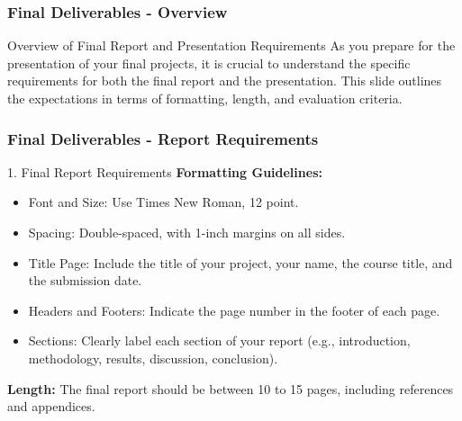 \documentclass{beamer}
\begin{document}
\begin{frame}[fragile]
    \frametitle{Final Deliverables - Overview}
    \begin{block}{Overview of Final Report and Presentation Requirements}
        As you prepare for the presentation of your final projects, it is crucial to understand the specific requirements for both the final report and the presentation. This slide outlines the expectations in terms of formatting, length, and evaluation criteria.
    \end{block}
\end{frame}

\begin{frame}[fragile]
    \frametitle{Final Deliverables - Report Requirements}
    \begin{block}{1. Final Report Requirements}
        \textbf{Formatting Guidelines:}
        \begin{itemize}
            \item Font and Size: Use Times New Roman, 12 point.
            \item Spacing: Double-spaced, with 1-inch margins on all sides.
            \item Title Page: Include the title of your project, your name, the course title, and the submission date.
            \item Headers and Footers: Indicate the page number in the footer of each page.
            \item Sections: Clearly label each section of your report (e.g., introduction, methodology, results, discussion, conclusion).
        \end{itemize}
        
        \textbf{Length:} The final report should be between 10 to 15 pages, including references and appendices.
    \end{block}
\end{frame}
\end{document}
